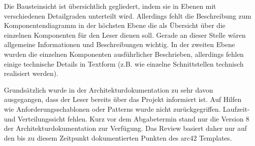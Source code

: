 Die Bausteinsicht ist übersichtlich gegliedert, indem sie in Ebenen mit verschiedenen Detailgraden unterteilt wird. Allerdings fehlt die Beschreibung zum Komponentendiagramm in der höchsten Ebene die als Übersicht über die einzelnen Komponenten für den Leser dienen soll. Gerade an dieser Stelle wären allgemeine Informationen und Beschreibungen wichtig. In der zweiten Ebene wurden die einzelnen Komponenten ausführlicher Beschrieben, allerdings fehlen einige technische Details in Textform (z.B. wie einzelne Schnittstellen technisch realisiert werden).


Grundsätzlich wurde in der Architekturdokumentation zu sehr davon ausgegangen, dass der Leser bereits über das Projekt informiert ist. Auf Hilfen wie Anforderungsschablonen oder Patterns wurde nicht zurückgegriffen. Laufzeit- und Verteilungssicht fehlen. Kurz vor dem Abgabetermin stand nur die Version 8 der Architekturdokumentation zur Verfügung. Das Review basiert daher nur auf den bis zu diesem Zeitpunkt dokumentierten Punkten des arc42 Templates.